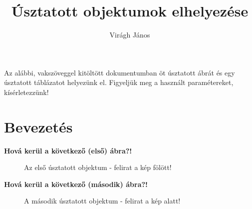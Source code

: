 \documentclass{article}
\title{Úsztatott objektumok elhelyezése}
\author{Virágh János}
\begin{document}
\maketitle
\tableofcontents
\listoffigures
\listoftables

\vspace*{0.1in}
\noindent Az alábbi, vakszöveggel kitöltött dokumentumban öt úsztatott ábrát és egy úsztatott táblázatot helyezünk el. Figyeljük meg a használt paramétereket, kísérletezzünk!
\section{Bevezetés}
\hulipsum[2-4]

\textbf{Hová kerül a következő (első) ábra?!}

\begin{figure}[h] %
\caption{Az első úsztatott objektum - felirat a kép fölött!}
% 
\centering
{}%
\end{figure}

\hulipsum[1-3]

\textbf{Hová kerül a következő (második) ábra?!}

\begin{figure}[h] %
% 
\centering
{}%
\caption{A második úsztatott objektum - felirat a kép alatt!}
\end{figure}
\end{document}
